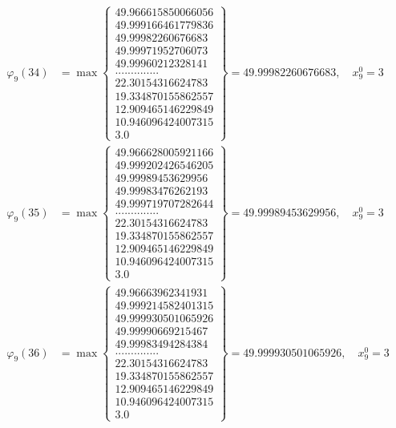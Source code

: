 \documentclass{article}
\begin{document}
\begin{align*}
  
  
  
\varphi_{9}(34) &= \max \left\{ \begin{array}{c}
49.966615850066056 \\
 49.999166461779836 \\
 49.99982260676683 \\
 49.99971952706073 \\
 49.99960212328141 \\
 .............. \\
 22.30154316624783 \\
 19.334870155862557 \\
 12.909465146229849 \\
 10.946096424007315 \\
 3.0
\end{array} \right\} = 49.99982260676683, \quad x_{9}^0 = 3\\
  
  
  
  
\varphi_{9}(35) &= \max \left\{ \begin{array}{c}
49.966628005921166 \\
 49.999202426546205 \\
 49.99989453629956 \\
 49.99983476262193 \\
 49.999719707282644 \\
 .............. \\
 22.30154316624783 \\
 19.334870155862557 \\
 12.909465146229849 \\
 10.946096424007315 \\
 3.0
\end{array} \right\} = 49.99989453629956, \quad x_{9}^0 = 3\\
  
  
  
  
\varphi_{9}(36) &= \max \left\{ \begin{array}{c}
49.96663962341931 \\
 49.999214582401315 \\
 49.999930501065926 \\
 49.99990669215467 \\
 49.99983494284384 \\
 .............. \\
 22.30154316624783 \\
 19.334870155862557 \\
 12.909465146229849 \\
 10.946096424007315 \\
 3.0
\end{array} \right\} = 49.999930501065926, \quad x_{9}^0 = 3\\
  
  
\end{align*}
\end{document}
